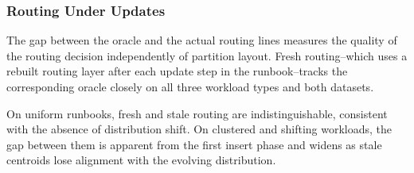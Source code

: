 \documentclass[sigconf,review,anonymous]{acmart}
\newcommand{\dk}[1]{\textcolor{teal}{(DK: #1)}}
\begin{document}

\subsubsection{Routing Under Updates}
\label{sec:routing-under-updates}


The gap between the oracle and the actual routing lines measures the quality of the routing decision independently of partition layout. Fresh routing--which uses a rebuilt routing layer after each update step in the runbook--tracks the corresponding oracle closely on all three workload types and both datasets. 

On uniform runbooks, fresh and stale routing are indistinguishable, consistent with the absence of distribution shift. On clustered and shifting workloads, the gap between them is apparent from the first insert phase and widens as stale centroids lose alignment with the evolving distribution.

\end{document}
